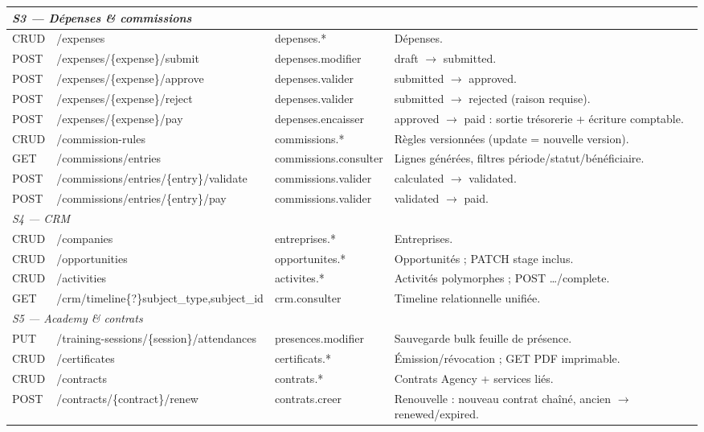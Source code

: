 \documentclass[11pt,a4paper]{article}
\begin{document}
\begin{longtable}{|p{1.3cm}|p{4.6cm}|p{2.7cm}|p{6.8cm}|}
\multicolumn{4}{|l|}{\cellcolor{peklight}\textit{S3 --- Dépenses \& commissions}} \\ \hline
CRUD & /expenses & depenses.* & Dépenses. \\ \hline
POST & /expenses/\{expense\}/submit & depenses.modifier & draft $\rightarrow$ submitted. \\ \hline
POST & /expenses/\{expense\}/approve & depenses.valider & submitted $\rightarrow$ approved. \\ \hline
POST & /expenses/\{expense\}/reject & depenses.valider & submitted $\rightarrow$ rejected (raison requise). \\ \hline
POST & /expenses/\{expense\}/pay & depenses.encaisser & approved $\rightarrow$ paid : sortie trésorerie + écriture comptable. \\ \hline
CRUD & /commission-rules & commissions.* & Règles versionnées (update = nouvelle version). \\ \hline
GET & /commissions/entries & commissions.consulter & Lignes générées, filtres période/statut/bénéficiaire. \\ \hline
POST & /commissions/entries/\{entry\}/validate & commissions.valider & calculated $\rightarrow$ validated. \\ \hline
POST & /commissions/entries/\{entry\}/pay & commissions.valider & validated $\rightarrow$ paid. \\ \hline
\multicolumn{4}{|l|}{\cellcolor{peklight}\textit{S4 --- CRM}} \\ \hline
CRUD & /companies & entreprises.* & Entreprises. \\ \hline
CRUD & /opportunities & opportunites.* & Opportunités ; PATCH stage inclus. \\ \hline
CRUD & /activities & activites.* & Activités polymorphes ; POST \ldots/complete. \\ \hline
GET & /crm/timeline\{?\}subject\_type,subject\_id & crm.consulter & Timeline relationnelle unifiée. \\ \hline
\multicolumn{4}{|l|}{\cellcolor{peklight}\textit{S5 --- Academy \& contrats}} \\ \hline
PUT & /training-sessions/\{session\}/attendances & presences.modifier & Sauvegarde bulk feuille de présence. \\ \hline
CRUD & /certificates & certificats.* & Émission/révocation ; GET PDF imprimable. \\ \hline
CRUD & /contracts & contrats.* & Contrats Agency + services liés. \\ \hline
POST & /contracts/\{contract\}/renew & contrats.creer & Renouvelle : nouveau contrat chaîné, ancien $\rightarrow$ renewed/expired. \\ \hline

\end{longtable}
\end{document}

